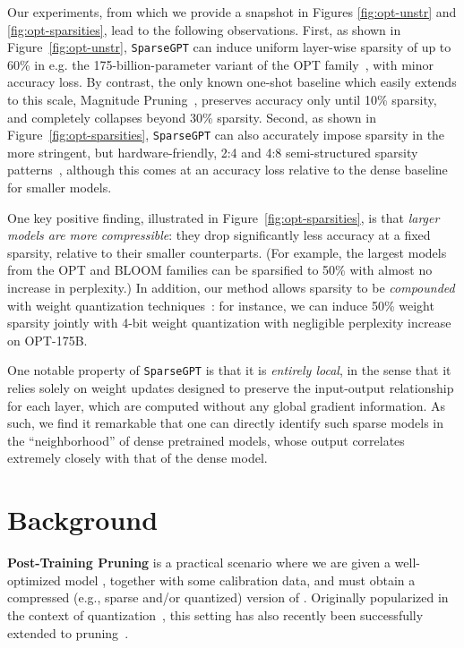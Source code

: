 \documentclass{article}
\theoremstyle{plain}
\theoremstyle{definition}
\theoremstyle{remark}
\renewcommand{\paragraph}[1]{\vspace{-0.1em} \noindent \textbf{#1}}
\newcommand{\sparsegpt}[1]{\texttt{SparseGPT}}
\begin{document}
Our experiments, from which we provide a snapshot in Figures \ref{fig:opt-unstr} and \ref{fig:opt-sparsities}, lead to the following observations. 
First, as shown in Figure~\ref{fig:opt-unstr}, \sparsegpt{} can induce uniform layer-wise sparsity of up to 60\% in e.g. the 175-billion-parameter variant of the OPT family~\cite{zhang2022opt}, with minor accuracy loss. 
By contrast, the only known one-shot baseline which easily extends to this scale, Magnitude Pruning~\cite{hagiwara1994, han2015learning}, preserves accuracy only until 10\% sparsity, and completely collapses beyond 30\% sparsity. 
Second, as shown in Figure~\ref{fig:opt-sparsities}, \sparsegpt{} can also accurately impose sparsity in the 
more stringent, but hardware-friendly, 2:4 and 4:8 semi-structured sparsity patterns~\cite{NVIDIASparse}, 
although this comes at an accuracy loss relative to the dense baseline for smaller models.  

One key positive finding, illustrated in Figure~\ref{fig:opt-sparsities}, is that \emph{larger models are more compressible}:  
 they drop significantly less accuracy at a fixed sparsity, relative to their smaller counterparts. 
 (For example, the largest models from the OPT and BLOOM families can be sparsified to 50\% with almost no increase in perplexity.) 
In addition, our method allows sparsity to be \emph{compounded} with weight quantization techniques~\citep{frantar2022gptq}: 
for instance, we can induce 50\% weight sparsity jointly with 4-bit weight quantization with negligible perplexity increase on OPT-175B. 

One notable property of \sparsegpt{} is that it is \emph{entirely local}, in the sense that it relies solely on weight updates designed to preserve the input-output relationship for each layer, which are computed without any global gradient information. As such, we find it remarkable that one can directly identify such sparse models in the ``neighborhood'' of dense pretrained models, whose output correlates extremely closely with that of the dense model.  

\section{Background}
\label{sec:preliminaries}

\paragraph{Post-Training Pruning} is a practical scenario where we are given a well-optimized model , together with some calibration data, and must obtain a compressed (e.g., sparse and/or quantized) version of . Originally popularized in the context of quantization~\cite{hubara2021accurate, nagel2020up, li2021brecq}, this setting has also recently been successfully extended to pruning~\cite{hubara2021accelerated, frantar2022obc, kwon2022fast}.
\end{document}
